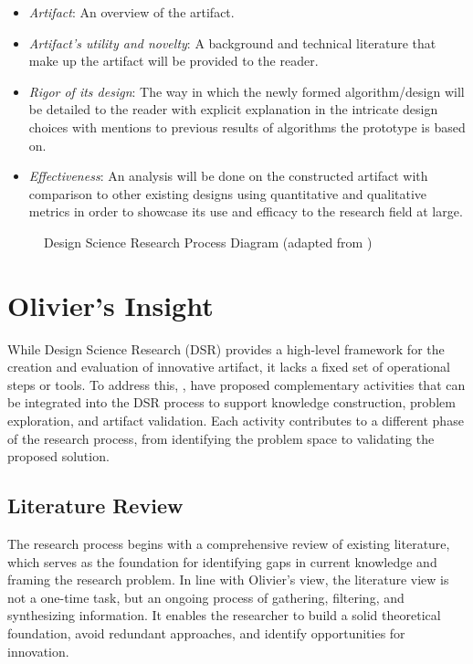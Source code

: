 \begin{enumerate}
\begin{itemize}
        \item \textit{Artifact}: An overview of the artifact.
        \item \textit{Artifact's utility and novelty}: A background and technical literature that make up the artifact will be provided to the reader.
        \item \textit{Rigor of its design}: The way in which the newly formed algorithm/design will be detailed to the reader with explicit explanation in the intricate design choices with mentions to previous results of algorithms the prototype is based on.
        \item \textit{Effectiveness}: An analysis will be done on the constructed artifact with comparison to other existing designs using quantitative and qualitative metrics in order to showcase its use and efficacy to the research field at large.
    \end{itemize}
\end{enumerate}

\begin{figure}[H] %
	\centering %
	\caption{Design Science Research Process Diagram (adapted from \cite{hevner2004design})}
	\label{fig:dsr} %
\end{figure}

\section{Olivier's Insight}
While Design Science Research (DSR) provides a high-level framework for the creation and evaluation of innovative artifact, it lacks a fixed set of operational steps or tools. To address this, \cite{olivier2009information}, have proposed complementary activities that can be integrated into the DSR process to support knowledge construction, problem exploration, and artifact validation. Each activity contributes to a different phase of the research process, from identifying the problem space to validating the proposed solution.

\parbreak

\subsection{Literature Review}
\noindent The research process begins with a comprehensive review of existing literature, which serves as the foundation for identifying gaps in current knowledge and framing the research problem. In line with Olivier's view, the literature view is not a one-time task, but an ongoing process of gathering, filtering, and synthesizing information. It enables the researcher to build a solid theoretical foundation, avoid redundant approaches, and identify opportunities for innovation.

